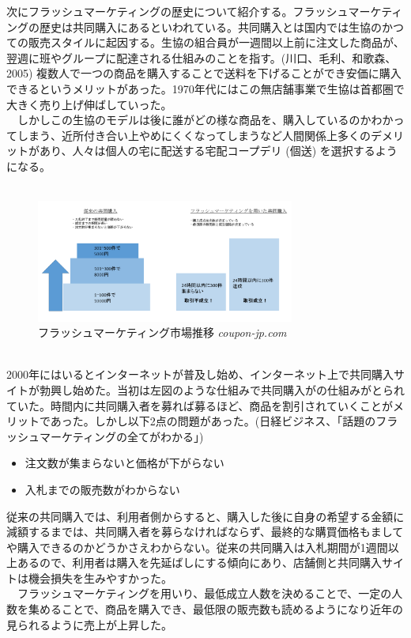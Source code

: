 次にフラッシュマーケティングの歴史について紹介する。フラッシュマーケティングの歴史は共同購入にあるといわれている。共同購入とは国内では生協のかつての販売スタイルに起因する。生協の組合員が一週間以上前に注文した商品が、翌週に班やグループに配達される仕組みのことを指す。(川口、毛利、和歌森、2005) 複数人で一つの商品を購入することで送料を下げることができ安価に購入できるというメリットがあった。1970年代にはこの無店舗事業で生協は首都圏で大きく売り上げ伸ばしていった。
\\　しかしこの生協のモデルは後に誰がどの様な商品を、購入しているのかわかってしまう、近所付き合い上やめにくくなってしまうなど人間関係上多くのデメリットがあり、人々は個人の宅に配送する宅配コープデリ (個送) を選択するようになる。
\\
\\
\begin{figure}[htbp]
	\centering
	\includegraphics[width=85mm, bb=0 0 600 272]{figures/fm.jpg}
	\caption{フラッシュマーケティング市場推移 {\itshape coupon-jp.com}}
	\label{フラッシュマーケティング市場推移}
\end{figure}
\\2000年にはいるとインターネットが普及し始め、インターネット上で共同購入サイトが勃興し始めた。当初は左図のような仕組みで共同購入がの仕組みがとられていた。時間内に共同購入者を募れば募るほど、商品を割引されていくことがメリットであった。しかし以下2点の問題があった。(日経ビジネス、「話題のフラッシュマーケティングの全てがわかる」)
\begin{itemize}
	\item 注文数が集まらないと価格が下がらない
	\item 入札までの販売数がわからない
\end{itemize}

従来の共同購入では、利用者側からすると、購入した後に自身の希望する金額に減額するまでは、共同購入者を募らなければならず、最終的な購買価格もましてや購入できるのかどうかさえわからない。従来の共同購入は入札期間が1週間以上あるので、利用者は購入を先延ばしにする傾向にあり、店舗側と共同購入サイトは機会損失を生みやすかった。
\\　フラッシュマーケティングを用いり、最低成立人数を決めることで、一定の人数を集めることで、商品を購入でき、最低限の販売数も読めるようになり近年の見られるように売上が上昇した。

